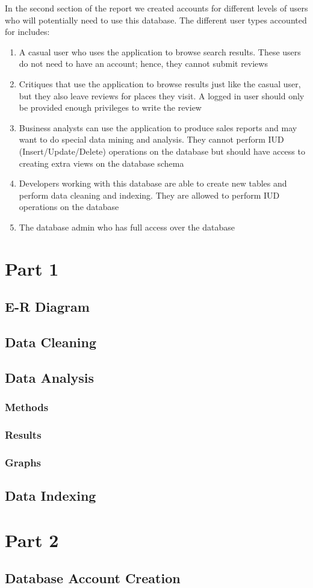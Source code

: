 \documentclass[12pt]{scrbook}
\begin{document}
In the second section of the report we created accounts for different levels of users who will
potentially need to use this database. The different user types accounted for includes:
\begin{enumerate}
  \item{A casual user who uses the application to browse search results. These users do not need
	to have an account; hence, they cannot submit reviews}
  \item{Critiques that use the application to browse results just like the casual user, but they also
	leave reviews for places they visit. A logged in user should only be provided enough privileges
	to write the review}
  \item{Business analysts can use the application to produce sales reports and may want to do
	special data mining and analysis. They cannot perform IUD (Insert/Update/Delete) operations
	on the database but should have access to creating extra views on the database
	schema}
  \item{Developers working with this database are able to create new tables and perform data
	cleaning and indexing. They are allowed to perform IUD operations on the database}
  \item{The database admin who has full access over the database}
\end{enumerate}

\section{Part 1}
\subsection{E-R Diagram}

\subsection{Data Cleaning}

\subsection{Data Analysis}

\subsubsection{Methods}

\subsubsection{Results}

\subsubsection{Graphs}

\subsection{Data Indexing}

\section{Part 2}
\subsection{Database Account Creation}
\end{document}

